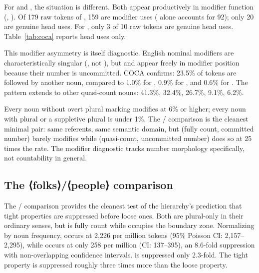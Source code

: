 \documentclass[12pt,a4paper]{article}
\DeclareRobustCommand{\mentionhead}[1]{⟨\textup{#1}⟩} %
\begin{document}
For  and , the situation is different. Both appear productively in modifier function (, ). Of 179 raw tokens of , 159 are modifier uses ( alone accounts for 92); only 20 are genuine head uses. For , only 3 of 10 raw  tokens are genuine head uses. Table~\ref{tab:coca} reports head uses only.

This modifier asymmetry is itself diagnostic. English nominal modifiers are characteristically singular (, not ), but  and  appear freely in modifier position because their number is uncommitted. COCA confirms: 23.5\% of  tokens are followed by another noun, compared to 1.0\% for , 0.9\% for , and 0.6\% for . The pattern extends to other quasi-count nouns:  41.3\%,  32.4\%,  26.7\%,  9.1\%,  6.2\%.

Every noun without overt plural marking modifies at 6\% or higher; every noun with plural  or a suppletive plural is under 1\%. The / comparison is the cleanest minimal pair: same referents, same semantic domain, but  (fully count, committed number) barely modifies while  (quasi-count, uncommitted number) does so at 25 times the rate. The modifier diagnostic tracks number morphology specifically, not countability in general.

\subsection{The \mentionhead{folks}/\mentionhead{people} comparison}

The / comparison provides the cleanest test of the hierarchy's prediction that tight properties are suppressed before loose ones. Both are plural-only in their ordinary senses, but  is fully count while  occupies the boundary zone. Normalizing by noun frequency,  occurs at 2{,}226 per million tokens (95\% Poisson CI: 2{,}157--2{,}295), while  occurs at only 258 per million (CI: 137--395), an 8.6-fold suppression with non-overlapping confidence intervals.  is suppressed only 2.3-fold. The tight property is suppressed roughly three times more than the loose property.
\end{document}
